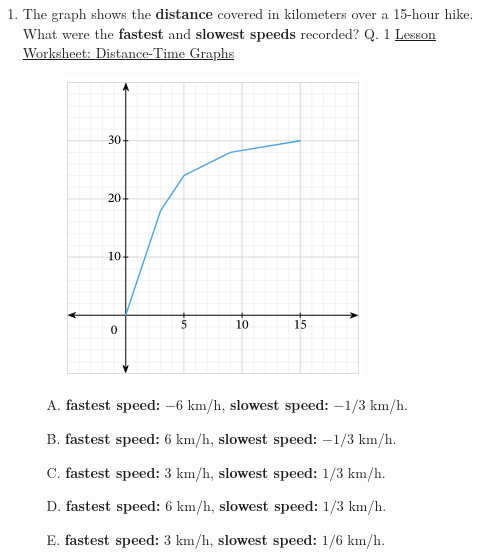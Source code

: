 \documentclass[A4,12pt]{article}
\begin{document}
\begin{enumerate}[label=\bfseries (\arabic*)]
\item The graph shows the \textbf{distance} covered in kilometers over a 15-hour hike. What were the \textbf{fastest} and \textbf{slowest} \textbf{speeds} recorded? \cite{Nagwa} Q. 1 \href{https://www.nagwa.com/en/worksheets/932192593730/}{Lesson Worksheet: Distance-Time Graphs}
%
\begin{figure}[H]
    \centering
    \includegraphics[scale=1]{Nagwa_Q1_kin2.png}
\end{figure}
%
\begin{itemize}
    \item[A. ] \textbf{fastest speed:} $-6$ km/h, \textbf{slowest speed:} $-1/3$ km/h.
    \item[B. ] \textbf{fastest speed:} $6$ km/h, \textbf{slowest speed:} $-1/3$ km/h.
    \item[C. ] \textbf{fastest speed:} $3$ km/h, \textbf{slowest speed:} $1/3$ km/h.
    \item[D. ] \textbf{fastest speed:} $6$ km/h, \textbf{slowest speed:} $1/3$ km/h.
    \item[E. ] \textbf{fastest speed:} $3$ km/h, \textbf{slowest speed:} $1/6$ km/h.
\end{itemize}
%

\end{enumerate}
\end{document}
